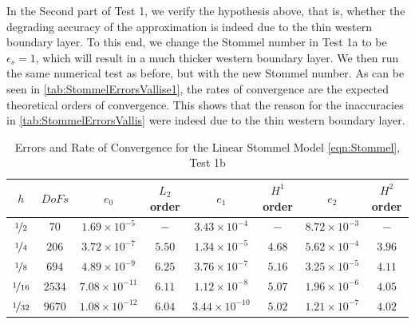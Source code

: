 In the Second part of Test 1, we verify the hypothesis above, that is, whether
the degrading accuracy of the approximation is indeed due to the thin western
boundary layer. To this end, we change the Stommel number in Test 1a to be
$\epsilon_s=1$, which will result in a much thicker western boundary layer. We
then run the same numerical test as before, but with the new Stommel number. As
can be seen in \autoref{tab:StommelErrorsVallise1}, the rates of convergence are
the expected theoretical orders of convergence. This shows that the reason for
the inaccuracies in \autoref{tab:StommelErrorsVallis} were indeed due to the
thin western boundary layer.

\begin{table}%
\begin{center}
\begin{tabular}{|c|c|c|c|c|c|c|c|}%
  \hline
  $h$ & $DoFs$ & $e_0$ & $L_2$ order & $e_1$ & $H^1$ order & $e_2$ & $H^2$ order \\[0.2em] %
  \hline
  $\nicefrac{1}{2}$ & $70$ & $1.69\times 10^{-5}$ & $-$ & $3.43\times 10^{-4}$ & $-$ & $8.72\times 10^{-3}$ & $-$ \\[0.2em] %
  $\nicefrac{1}{4}$ & $206$ & $3.72\times 10^{-7}$ & $5.50$ & $1.34\times 10^{-5}$ & $4.68$ & $5.62\times 10^{-4}$ & $3.96$ \\[0.2em] %
  $\nicefrac{1}{8}$ & $694$ & $4.89\times 10^{-9}$ & $6.25$ & $3.76\times 10^{-7}$ & $5.16$ & $3.25\times 10^{-5}$ & $4.11$ \\[0.2em] %
  $\nicefrac{1}{16}$ & $2534$ & $7.08\times 10^{-11}$ & $6.11$ & $1.12\times 10^{-8}$ & $5.07$ & $1.96\times 10^{-6}$ & $4.05$ \\[0.2em] %
  $\nicefrac{1}{32}$ & $9670$ & $1.08\times 10^{-12}$ & $6.04$ & $3.44\times 10^{-10}$ & $5.02$ & $1.21\times 10^{-7}$ & $4.02$ \\[0.2em] %
  \hline
\end{tabular}
\end{center}
\caption{Errors and Rate of Convergence for the Linear Stommel Model \eqref{eqn:Stommel}, Test 1b \cite{Vallis06}}
\label{tab:StommelErrorsVallise1}
\end{table}

